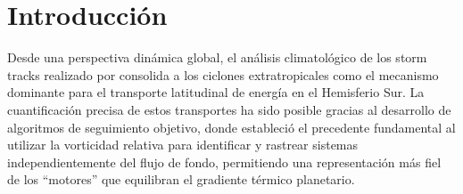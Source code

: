 \chapter{Introducción} \label{ch:introduccion}

Desde una perspectiva dinámica global, el análisis climatológico de los storm tracks realizado por \citet{hoskins2005new} consolida a los ciclones extratropicales como el mecanismo dominante para el transporte latitudinal de energía en el Hemisferio Sur. La cuantificación precisa de estos transportes ha sido posible gracias al desarrollo de algoritmos de seguimiento objetivo, donde \citet{sinclair1994objective} estableció el precedente fundamental al utilizar la vorticidad relativa para identificar y rastrear sistemas independientemente del flujo de fondo, permitiendo una representación más fiel de los ``motores'' que equilibran el gradiente térmico planetario.

